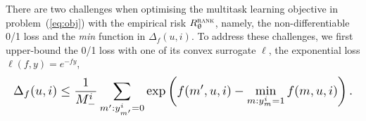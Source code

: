 %


There are two challenges %
when optimising the multitask learning objective in problem~(\ref{eq:obj}) 
with the empirical risk $R_{\uptheta}^{\textsc{rank}}$,
namely, the non-differentiable 0/1 loss and the \emph{min} function in %
$\Delta_f(u, i)$.
To address these challenges, we first upper-bound %
the 0/1 loss with one of its convex surrogate $\ell$,
\eg the exponential loss $\ell(f, y) = e^{-fy}$,
\begin{equation*}
\resizebox{\columnwidth}{!}{$
\displaystyle 
\Delta_f(u, i) \le \frac{1}{M_-^i} \sum_{m': y_{m'}^i = 0} \exp \left(f(m', u, i) - \min_{m: y_m^i = 1} f(m, u, i) \right).
$}
\end{equation*}

